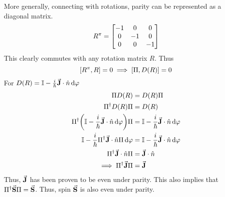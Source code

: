 \documentclass[12pt,a4paper,titlepage]{article}
\begin{document}
More generally, connecting with rotations, parity can be represented as a diagonal matrix.
\begin{equation}
R^{\pi}=\mqty[-1 & 0 & 0\\ 0 & -1 & 0\\ 0 & 0 & -1]
\end{equation}
This clearly commutes with any rotation matrix $R$. Thus
\begin{equation}
\comm{R^{\pi}}{R}=0\implies\comm{\Pi}{D(R)}=0
\end{equation}
For $D(R)=\mathbb{I}-\frac{i}{\hbar}\vec{\vb{J}}\cdot\hat{n}\dd{\varphi}$
\begin{equation}
\begin{aligned}
\Pi D(R)&=D(R)\Pi\\
\Pi^{\dagger}D(R)\Pi&=D(R)\\
\Pi^{\dagger}\qty(\mathbb{I}-\frac{i}{\hbar}\vec{\vb{J}}\cdot\hat{n}\dd{\varphi})\Pi&=\mathbb{I}-\frac{i}{\hbar}\vec{\vb{J}}\cdot\hat{n}\dd{\varphi}\\
\mathbb{I}-\frac{i}{\hbar}\Pi^{\dagger}\vec{\vb{J}}\cdot\hat{n}\Pi\dd{\varphi}&=\mathbb{I}-\frac{i}{\hbar}\vec{\vb{J}}\cdot\hat{n}\dd{\varphi}\\
\Pi^{\dagger}\vec{\vb{J}}\cdot\hat{n}\Pi&=\vec{\vb{J}}\cdot\hat{n}\\
\implies\Pi^{\dagger}\vec{\vb{J}}\Pi&=\vec{\vb{J}}
\end{aligned}
\end{equation}
Thus, $\vec{\vb{J}}$ has been proven to be even under parity. This also implies that $\Pi^{\dagger}\vec{\vb{S}}\Pi=\vec{\vb{S}}$. Thus, spin $\vec{\vb{S}}$ is also even under parity.\\
\end{document}
